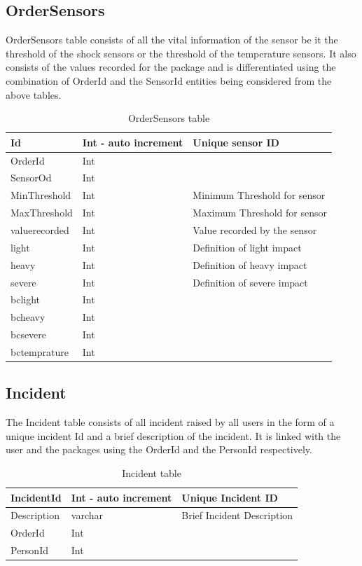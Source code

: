 \subsection{OrderSensors}
OrderSensors table consists of all the vital information of the sensor be it the threshold of the shock sensors or the threshold of the temperature sensors. It also consists of the values recorded for the package and is differentiated using the combination of OrderId and the SensorId entities being considered from the above tables.
\begin{table}[!ht]
\begin{center}
\begin{tabular}{ |l|l|l| } 
 \hline
Id & Int - auto increment & Unique sensor ID \\
 \hline
OrderId & Int &  \\
 \hline
SensorOd & Int & \\
 \hline
MinThreshold & Int & Minimum Threshold for sensor\\
 \hline
MaxThreshold & Int & Maximum Threshold for sensor\\
 \hline
valuerecorded & Int & Value recorded by the sensor\\
 \hline
light & Int & Definition of light impact \\
 \hline
heavy & Int & Definition of heavy impact \\
 \hline
severe & Int & Definition of severe impact \\
 \hline
bclight & Int &  \\
 \hline
bcheavy & Int &  \\
 \hline
bcsevere & Int &  \\
 \hline
bctemprature & Int &  \\
 \hline
\end{tabular}
\end{center}
    \caption{OrderSensors table}
\end{table}

\subsection{Incident}

The Incident table consists of all incident raised by all users in the form of a unique incident Id and a brief description of the incident. It is linked with the user and the packages using the OrderId and the PersonId respectively.
\begin{table}[!ht]
\begin{center}
\begin{tabular}{ |l|l|l| } 
 \hline
IncidentId & Int - auto increment & Unique Incident ID \\
 \hline
Description & varchar & Brief Incident Description \\
 \hline
OrderId & Int &  \\
 \hline
PersonId & Int &  \\
 \hline
\end{tabular}
\end{center}
    \caption{Incident table}
\end{table}


